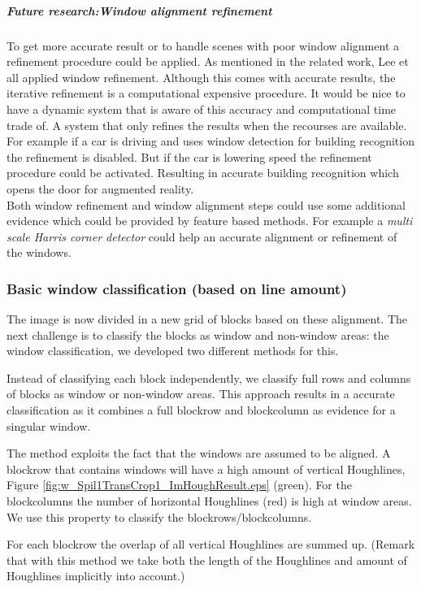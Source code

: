 \subparagraph{Future research:Window alignment refinement}
To get more accurate result or to handle scenes with poor window alignment a
refinement procedure could be applied.  As mentioned in the related work, Lee et
all \cite{Lee_extraction} applied window refinement.  Although this comes with
accurate results, the iterative refinement is a computational expensive
procedure.  It would be nice to have a dynamic system that is aware of this
accuracy and computational time trade of. A system that only refines the results
when the recourses are available.  For example if a car is driving and uses
window detection for building recognition the refinement is disabled.  But if
the car is lowering speed the refinement procedure could be activated.
Resulting in accurate building recognition which opens the door for augmented
reality.\\

Both window refinement and window alignment steps could use some additional
evidence which could be provided by feature based methods.  For example a
\emph{multi scale Harris corner detector} could help an accurate alignment or
refinement of the windows.








\subsubsection{Basic window classification (based on line amount)}
The image is now divided in a new grid of blocks based on these
alignment. The next challenge is to classify the blocks as window and
non-window areas: the window classification, we developed two different methods for this.

Instead of classifying each block independently, we classify full rows and
columns of blocks as window or non-window areas.  This approach results in a accurate
classification as it combines a full blockrow and blockcolumn as evidence for a singular
window. 

The method exploits the fact that the windows are assumed to be
aligned.
A blockrow that contains windows will have a high amount of vertical
Houghlines, Figure \ref{fig:w_Spil1TransCrop1_ImHoughResult.eps}
(green). For the blockcolumns the number of horizontal Houghlines
 (red) is high at window areas.  We use this property to classify 
 the blockrows/blockcolumns. 

For each blockrow the overlap of all vertical Houghlines are summed up.
(Remark that with this method we take both the length of the Houghlines and
amount of Houghlines implicitly into account.)

